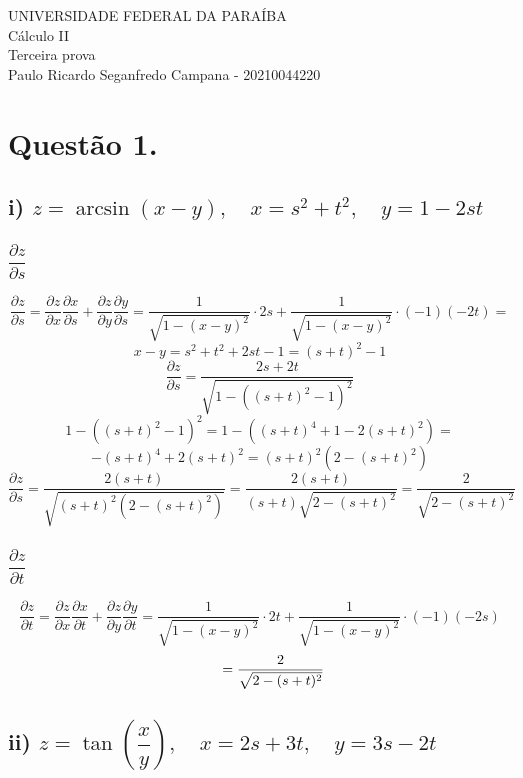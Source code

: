 \documentclass[12pt]{article}
\begin{document}
\setcounter{secnumdepth}{0}
\begin{center}
	UNIVERSIDADE FEDERAL DA PARAÍBA\\
	Cálculo II\\
	Terceira prova\\
	Paulo Ricardo Seganfredo Campana - 20210044220
\end{center}

\section{Questão 1.}
\subsection{i) $z=\arcsin(x-y), \quad x=s^{2}+t^{2}, \quad y=1-2st$}
\subsubsection{$\dfrac{\partial z}{\partial s}$}

\[\dfrac{\partial z}{\partial s} = \dfrac{\partial z}{\partial x} \dfrac{\partial x}{\partial s} + \dfrac{\partial z}{\partial y} \dfrac{\partial y}{\partial s} = \dfrac{1}{\sqrt{1-(x-y)^{2}}} \cdot 2s + \dfrac{1}{\sqrt{1-(x-y)^{2}}} \cdot (-1)(-2t) =\]
\[x-y = s^{2}+t^{2}+2st-1 = (s+t)^{2}-1\]
\[\dfrac{\partial z}{\partial s} = \dfrac{2s+2t}{\sqrt{1-((s+t)^{2}-1)^{2}}} \]
\[1-((s+t)^{2}-1)^{2} = 1-((s+t)^{4}+1-2(s+t)^{2}) =\]
\[-(s+t)^{4}+2(s+t)^{2} = (s+t)^{2}(2-(s+t)^{2})\]
\[\dfrac{\partial z}{\partial s} = \dfrac{2(s+t)}{\sqrt{(s+t)^{2}(2-(s+t)^{2})}} = \dfrac{2(s+t)}{(s+t)\sqrt{2-(s+t)^{2}}} = \dfrac{2}{\sqrt{2-(s+t)^{2}}}\]

\subsubsection{$\dfrac{\partial z}{\partial t}$}

\[\dfrac{\partial z}{\partial t} = \dfrac{\partial z}{\partial x} \dfrac{\partial x}{\partial t} + \dfrac{\partial z}{\partial y} \dfrac{\partial y}{\partial t} = \dfrac{1}{\sqrt{1-(x-y)^{2}}} \cdot 2t + \dfrac{1}{\sqrt{1-(x-y)^{2}}} \cdot (-1)(-2s)\]
\[\hspace{+19pt} = \dfrac{2}{\sqrt{2-(s+t)^{2}}}\]

\subsection{ii) $z=\tan \left( \dfrac{x}{y} \right), \quad x=2s+3t, \quad y=3s-2t$}
\end{document}
